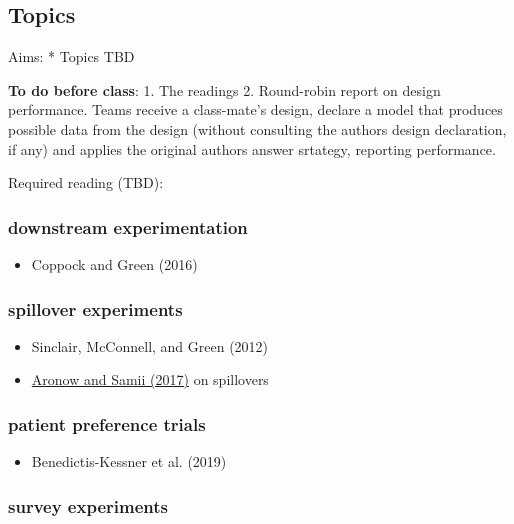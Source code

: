 \documentclass[
  10pt,
  a4paper,10pt]{extarticle}
\providecommand{\tightlist}{%
  \setlength{\itemsep}{0pt}\setlength{\parskip}{0pt}}
\begin{document}
\subsection{Topics}\label{topics}

Aims: * Topics TBD

\textbf{To do before class}: 1. The readings 2. Round-robin report on
design performance. Teams receive a class-mate's design, declare a model
that produces possible data from the design (without consulting the
authors design declaration, if any) and applies the original authors
answer srtategy, reporting performance.

Required reading (TBD):

\subsubsection{downstream
experimentation}\label{downstream-experimentation}

\begin{itemize}
\tightlist
\item
  Coppock and Green (2016)
\end{itemize}

\subsubsection{spillover experiments}\label{spillover-experiments}

\begin{itemize}
\tightlist
\item
  Sinclair, McConnell, and Green (2012)
\item
  \href{https://arxiv.org/abs/1305.6156}{Aronow and Samii (2017)} on
  spillovers
\end{itemize}

\subsubsection{patient preference
trials}\label{patient-preference-trials}

\begin{itemize}
\tightlist
\item
  Benedictis-Kessner et al. (2019)
\end{itemize}

\subsubsection{survey experiments}\label{survey-experiments}
\end{document}

